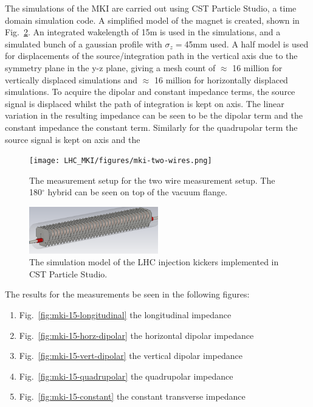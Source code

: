 The simulations of the MKI are carried out using CST Particle Studio, a time domain simulation code. A simplified model of the magnet is created, shown in Fig.~\ref{fig:mki-simulation-model}. An integrated wakelength of 15m is used in the simulations, and a simulated bunch of a gaussian profile with $\sigma_{z}=$45mm used. A half model is used for displacements of the source/integration path in the vertical axis due to the symmetry plane in the y-z plane, giving a mesh count of $\approx$ 16 million for vertically displaced simulations and $\approx$ 16 million for horizontally displaced simulations. To acquire the dipolar and constant impedance terms, the source signal is displaced whilst the path of integration is kept on axis. The linear variation in the resulting impedance can be seen to be the dipolar term and the constant impedance the constant term. Similarly for the quadrupolar term the source signal is kept on axis and the 



\begin{figure}
\begin{center}
\texttt{[image: LHC\_MKI/figures/mki-two-wires.png]}
\end{center}
\label{fig:mki-meas-two-wire}
\caption{The measurement setup for the two wire measurement setup. The 180$^{\circ}$ hybrid can be seen on top of the vacuum flange.}
\end{figure}

\begin{figure}
\begin{center}
\includegraphics[width=0.5\textwidth]{LHC_MKI/figures/simulation-model-mki-15.png}
\end{center}
\label{fig:mki-simulation-model}
\caption{The simulation model of the LHC injection kickers implemented in CST Particle Studio.}
\end{figure}


The results for the measurements be seen in the following figures:
\begin{enumerate}
\item{Fig.~\ref{fig:mki-15-longitudinal} the longitudinal impedance}
\item{Fig.~\ref{fig:mki-15-horz-dipolar} the horizontal dipolar impedance}
\item{Fig.~\ref{fig:mki-15-vert-dipolar} the vertical dipolar impedance}
\item{Fig.~\ref{fig:mki-15-quadrupolar} the quadrupolar impedance}
\item{Fig.~\ref{fig:mki-15-constant} the constant transverse impedance}
\end{enumerate}

